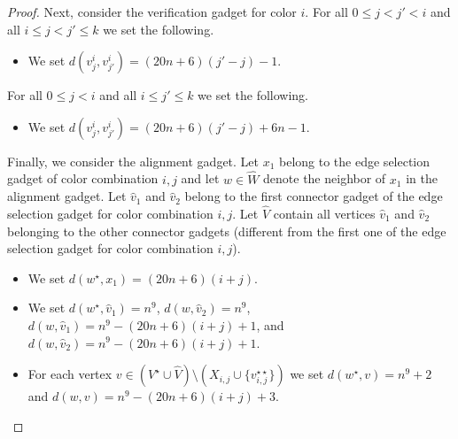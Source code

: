 \documentclass[a4paper,UKenglish,cleveref, autoref, thm-restate, anonymous]{lipics-v2021}
\begin{document}
\begin{proof}
Next, consider the verification gadget for color $i$. 
%
For all $0\le j<j'<i$ and all $i\le j<j'\le k$ we set the following.
\begin{itemize}
    \item We set $d(v^i_j,v^i_{j'})=(20n+6)(j'-j)-1$.
\end{itemize}
For all $0\le j<i$ and all $i\le j'\le k$ we set the following.
\begin{itemize}
    \item We set $d(v^i_j,v^i_{j'})=(20n+6)(j'-j)+6n-1$.
\end{itemize}

Finally, we consider the alignment gadget. Let $x_1$ belong to the edge selection gadget of color combination $i,j$ and let $w\in \hat{W}$ denote the neighbor of $x_1$ in the alignment gadget. Let $\hat{v}_1$ and $\hat{v}_2$ belong to the first connector gadget of the edge selection gadget for color combination $i,j$. Let $\hat{V}$ contain all vertices $\hat{v}_1$ and $\hat{v}_2$ belonging to the other connector gadgets (different from the first one of the edge selection gadget for color combination $i,j$). 
\begin{itemize}
    \item We set $d(w^\star,x_1)=(20n+6)(i+j)$.
    \item We set $d(w^\star,\hat{v}_1)=n^9$, $d(w,\hat{v}_2)=n^9$, $d(w,\hat{v}_1)=n^9-(20n+6)(i+j)+1$, and $d(w,\hat{v}_2)=n^9-(20n+6)(i+j)+1$.
    \item For each vertex $v\in (V^\star\cup \hat{V})\setminus (X_{i,j}\cup \{v_{i,j}^{\star\star}\})$ we set $d(w^\star,v)=n^9+2$ and $d(w,v)=n^9-(20n+6)(i+j)+3$.
\end{itemize}


\end{proof}
\end{document}
